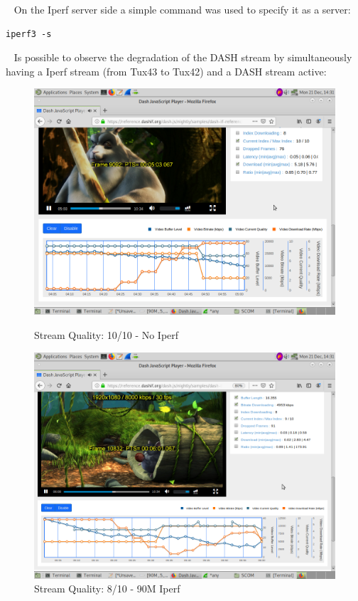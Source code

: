 \documentclass{article}
\begin{document}
~\newline
On the Iperf server side a simple command was used to specify it as a server:
\begin{verbatim}
iperf3 -s 
\end{verbatim}

~\newline
Is possible to observe the degradation of the DASH stream by simultaneously 
having a Iperf stream (from Tux43 to Tux42) and a DASH stream active:
\begin{figure}
    \centering
    \begin{minipage}{0.45\linewidth}
        \centering
        \includegraphics[width=0.9\linewidth]{GoodQuality} 
        \caption{Stream Quality: 10/10 - No Iperf}
    \end{minipage}\hfill
    \begin{minipage}{0.45\textwidth}
        \centering
        \includegraphics[width=0.9\linewidth]{PoorQuality}
        \caption{Stream Quality: 8/10 - 90M Iperf}
    \end{minipage}
\end{figure}
\FloatBarrier	
~\newline
\end{document}
